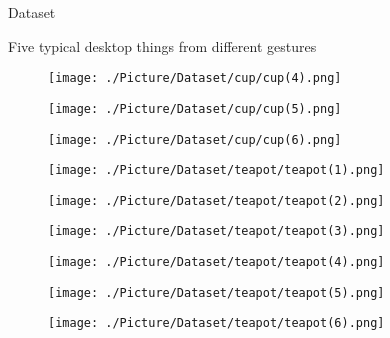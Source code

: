 \documentclass[xcolor=table,compress,blue]{beamer}
\begin{document}
\begin{frame}{Dataset}
\begin{exampleblock}{Five typical desktop things from different gestures}
\begin{figure}[htpb]
\begin{minipage}[b]{0.65in}
				\centerline{ \texttt{[image: ./Picture/Dataset/cup/cup(4).png]} }
			\end{minipage}
			\begin{minipage}[b]{0.65in}
				\centerline{ \texttt{[image: ./Picture/Dataset/cup/cup(5).png]} }
			\end{minipage}
			\begin{minipage}[b]{0.65in}
				\centerline{ \texttt{[image: ./Picture/Dataset/cup/cup(6).png]} }
			\end{minipage}
			\begin{minipage}[b]{0.65in}
				\centerline{ \texttt{[image: ./Picture/Dataset/teapot/teapot(1).png]} }
			\end{minipage}
			\begin{minipage}[b]{0.65in}
				\centerline{ \texttt{[image: ./Picture/Dataset/teapot/teapot(2).png]} }
			\end{minipage}
			\begin{minipage}[b]{0.65in}
				\centerline{ \texttt{[image: ./Picture/Dataset/teapot/teapot(3).png]} }
			\end{minipage}
			\begin{minipage}[b]{0.65in}
				\centerline{ \texttt{[image: ./Picture/Dataset/teapot/teapot(4).png]} }
			\end{minipage}
			\begin{minipage}[b]{0.65in}
				\centerline{ \texttt{[image: ./Picture/Dataset/teapot/teapot(5).png]} }
			\end{minipage}
			\begin{minipage}[b]{0.65in}
				\centerline{ \texttt{[image: ./Picture/Dataset/teapot/teapot(6).png]} }
			\end{minipage}
			
		\end{figure}
	\end{exampleblock}
\end{frame}
\end{document}

